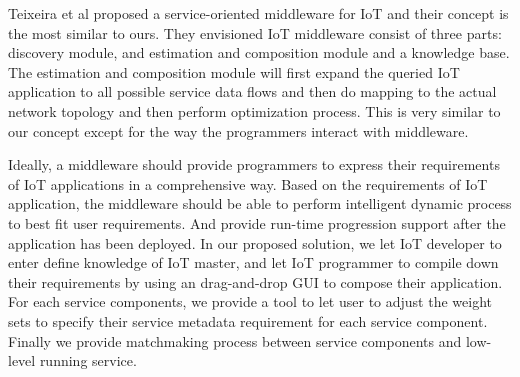 Teixeira et al proposed a service-oriented middleware for IoT and their concept is the most similar to ours\cite{Teixeira2013}. They envisioned IoT middleware consist of three parts: discovery module, and estimation and composition module and a knowledge base. The estimation and composition module will first expand the queried IoT application to all possible service data flows and then do mapping to the actual network topology and then perform optimization process. This is very similar to our concept except for the way the programmers interact with middleware.

Ideally, a middleware should provide programmers to express their requirements of IoT applications in a comprehensive way. Based on the requirements of IoT application, the middleware should be able to perform intelligent dynamic process to best fit user requirements. And provide run-time progression support after the application has been deployed. In our proposed solution, we let IoT developer to enter define knowledge of IoT master, and let IoT programmer to compile down their requirements by using an drag-and-drop GUI to compose their application. For each service components, we provide a tool to let user to adjust the weight sets to specify their service metadata requirement for each service component. Finally we provide matchmaking process between service components and low-level running service. 